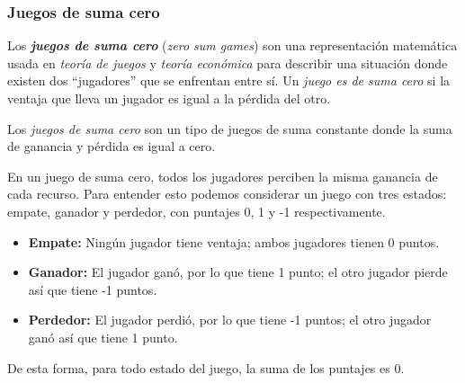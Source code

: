 \subsubsection{Juegos de suma cero}
  Los \textit{\textbf{juegos de suma cero}} \cite{noauthor_zero-sum_2022} (\textit{zero sum games}) 
  son una representación matemática usada en \textit{teoría de juegos} y \textit{teoría 
  económica} para describir una situación donde existen dos \enquote{jugadores} que se enfrentan
  entre sí.
  Un \textit{juego es de suma cero} si la ventaja que lleva un jugador es igual a la pérdida del
  otro.

  Los \textit{juegos de suma cero} son un tipo de juegos de suma constante donde la suma de 
  ganancia y pérdida es igual a cero.

  En un juego de suma cero, todos los jugadores perciben la misma ganancia de cada recurso.   
  Para entender esto podemos considerar un juego con tres estados: empate, ganador y perdedor, 
  con puntajes 0, 1 y -1 respectivamente.

  \begin{itemize}
    \item \textbf{Empate:} Ningún jugador tiene ventaja; ambos jugadores tienen 0 puntos.
    \item \textbf{Ganador:} El jugador ganó, por lo que tiene 1 punto; el otro jugador pierde 
      así que tiene -1 puntos.
    \item \textbf{Perdedor:} El jugador perdió, por lo que tiene -1 puntos; el otro jugador ganó 
      así que tiene 1 punto.
  \end{itemize}
  
  De esta forma, para todo estado del juego, la suma de los puntajes es 0.